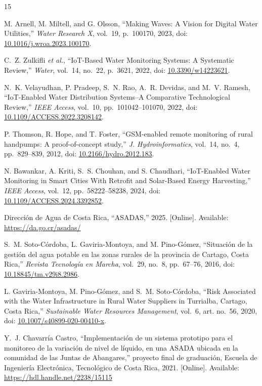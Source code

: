 \documentclass[conference]{IEEEtran}
\begin{document}
\begin{thebibliography}{15}

M. Arnell, M. Miltell, and G. Olsson, ``Making Waves: A Vision for Digital Water Utilities,'' \emph{Water Research X}, vol.~19, p.~100170, 2023, doi: \url{10.1016/j.wroa.2023.100170}.

C.~Z. Zulkifli \emph{et al.}, ``IoT-Based Water Monitoring Systems: A Systematic Review,'' \emph{Water}, vol.~14, no.~22, p.~3621, 2022, doi: \url{10.3390/w14223621}.

N.~K. Velayudhan, P. Pradeep, S.~N. Rao, A.~R. Devidas, and M.~V. Ramesh, ``IoT-Enabled Water Distribution Systems--A Comparative Technological Review,'' \emph{IEEE Access}, vol.~10, pp.~101042--101070, 2022, doi: \url{10.1109/ACCESS.2022.3208142}.

P. Thomson, R. Hope, and T. Foster, ``GSM-enabled remote monitoring of rural handpumps: A proof-of-concept study,'' \emph{J. Hydroinformatics}, vol.~14, no.~4, pp.~829--839, 2012, doi: \url{10.2166/hydro.2012.183}.

N. Bawankar, A. Kriti, S.~S. Chouhan, and S. Chaudhari, ``IoT-Enabled Water Monitoring in Smart Cities With Retrofit and Solar-Based Energy Harvesting,'' \emph{IEEE Access}, vol.~12, pp.~58222--58238, 2024, doi: \url{10.1109/ACCESS.2024.3392852}.

Dirección de Agua de Costa Rica, ``ASADAS,'' 2025. [Online]. Available: \url{https://da.go.cr/asadas/}

S.~M. Soto-Córdoba, L. Gaviria-Montoya, and M. Pino-Gómez, ``Situación de la gestión del agua potable en las zonas rurales de la provincia de Cartago, Costa Rica,'' \emph{Revista Tecnología en Marcha}, vol.~29, no.~8, pp.~67--76, 2016, doi: \url{10.18845/tm.v29i8.2986}.

L. Gaviria-Montoya, M. Pino-Gómez, and S.~M. Soto-Córdoba, ``Risk Associated with the Water Infrastructure in Rural Water Suppliers in Turrialba, Cartago, Costa Rica,'' \emph{Sustainable Water Resources Management}, vol.~6, art. no.~56, 2020, doi: \url{10.1007/s40899-020-00410-x}.

Y.~J. Chavarría Castro, ``Implementación de un sistema prototipo para el monitoreo de la variación de nivel de líquido, en una ASADA ubicada en la comunidad de las Juntas de Abangares,'' proyecto final de graduación, Escuela de Ingeniería Electrónica, Tecnológico de Costa Rica, 2021. [Online]. Available: \url{https://hdl.handle.net/2238/15115}


\end{thebibliography}
\end{document}
